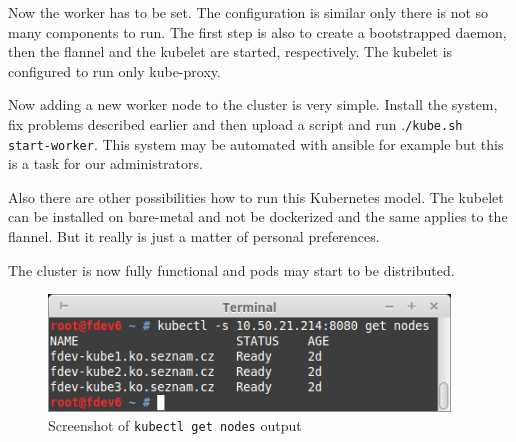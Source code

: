 Now the worker has to be set. The configuration is similar only there is not so many components to run. The first step is also to create a bootstrapped daemon, then the flannel and the kubelet are started, respectively. The kubelet is configured to run only kube-proxy.

Now adding a new worker node to the cluster is very simple. Install the system, fix problems described earlier and then upload a script and run .\lstinline{/kube.sh start-worker}. This system may be automated with ansible \cite{ansible} for example but this is a task for our administrators.

Also there are other possibilities how to run this Kubernetes model. The kubelet can be installed on bare-metal and not be dockerized and the same applies to the flannel. But it really is just a matter of personal preferences.

The cluster is now fully functional and pods may start to be distributed.

\begin{figure}[htb]\centering
  \includegraphics[width=0.95\textwidth]{images/kubectl_get_nodes.png}
  \caption
    {Screenshot of \lstinline{kubectl get nodes} output}
  \label{fig:kubectl-get-nodes}
\end{figure}

